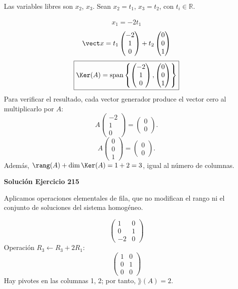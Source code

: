 Las variables libres son $x_{2}$, $x_{3}$. Sean $x_{2}=t_{1}$, $x_{3}=t_{2}$, con $t_i\in\mathbb R$.

\[
\begin{aligned}x_{1}=- 2 t_{1}\end{aligned}
\]
\[
\vect x=t_{1}\begin{pmatrix}-2\\1\\0\end{pmatrix} + t_{2}\begin{pmatrix}0\\0\\1\end{pmatrix}
\]
\[
\boxed{\Ker(A)=\operatorname{span}\left\{\begin{pmatrix}-2\\1\\0\end{pmatrix},\begin{pmatrix}0\\0\\1\end{pmatrix}\right\}}
\]
Para verificar el resultado, cada vector generador produce el vector cero al multiplicarlo por $A$:
\[
A\begin{pmatrix}-2\\1\\0\end{pmatrix}=\begin{pmatrix}0\\0\end{pmatrix}.
\]
\[
A\begin{pmatrix}0\\0\\1\end{pmatrix}=\begin{pmatrix}0\\0\end{pmatrix}.
\]
Además, $\rang(A)+\dim\Ker(A)=1+2=3$, igual al número de columnas.


\par\bigskip\noindent\textbf{Solución Ejercicio 215}\par\nobreak
Aplicamos operaciones elementales de fila, que no modifican el rango ni el conjunto de soluciones del sistema homogéneo.

\[
\begin{pmatrix}1&0\\0&1\\-2&0\end{pmatrix}
\]
Operación $R_{3}\leftarrow R_{3}+2R_{1}$:
\[
\begin{pmatrix}1&0\\0&1\\0&0\end{pmatrix}
\]
Hay pivotes en las columnas 1, 2; por tanto, $\boxed{\rang(A)=2}$.


